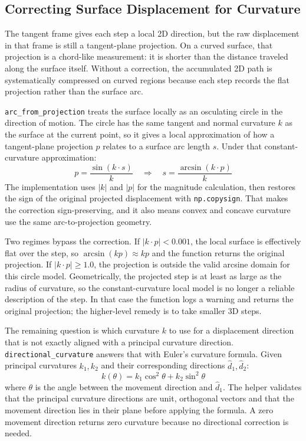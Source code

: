 \documentclass{article}
\begin{document}
\subsection{Correcting Surface Displacement for Curvature}

The tangent frame gives each step a local 2D direction, but the raw displacement in that frame is still a tangent-plane projection.
On a curved surface, that projection is a chord-like measurement: it is shorter than the distance traveled along the surface itself.
Without a correction, the accumulated 2D path is systematically compressed on curved regions because each step records the flat projection rather than the surface arc.

\texttt{arc\_from\_projection} treats the surface locally as an osculating circle in the direction of motion.
The circle has the same tangent and normal curvature $k$ as the surface at the current point, so it gives a local approximation of how a tangent-plane projection $p$ relates to a surface arc length $s$.
Under that constant-curvature approximation:
\[
  p = \frac{\sin(k \cdot s)}{k}
  \quad\Longrightarrow\quad
  s = \frac{\arcsin(k \cdot p)}{k}
\]
The implementation uses $|k|$ and $|p|$ for the magnitude calculation, then restores the sign of the original projected displacement with \texttt{np.copysign}.
That makes the correction sign-preserving, and it also means convex and concave curvature use the same arc-to-projection geometry.

Two regimes bypass the correction.
If $|k \cdot p| < 0.001$, the local surface is effectively flat over the step, so $\arcsin(kp) \approx kp$ and the function returns the original projection.
If $|k \cdot p| \geq 1.0$, the projection is outside the valid arcsine domain for this circle model.
Geometrically, the projected step is at least as large as the radius of curvature, so the constant-curvature local model is no longer a reliable description of the step.
In that case the function logs a warning and returns the original projection; the higher-level remedy is to take smaller 3D steps.

The remaining question is which curvature $k$ to use for a displacement direction that is not exactly aligned with a principal curvature direction.
\texttt{directional\_curvature} answers that with Euler's curvature formula.
Given principal curvatures $k_1, k_2$ and their corresponding directions $\hat{d}_1, \hat{d}_2$:
\[
  k(\theta) = k_1 \cos^2\theta + k_2 \sin^2\theta
\]
where $\theta$ is the angle between the movement direction and $\hat{d}_1$.
The helper validates that the principal curvature directions are unit, orthogonal vectors and that the movement direction lies in their plane before applying the formula.
A zero movement direction returns zero curvature because no directional correction is needed.
\end{document}
